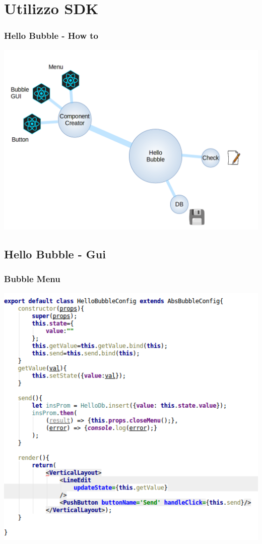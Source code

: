 \section{Utilizzo SDK}
\begin{frame}
	\frametitle{Hello Bubble - How to}
	\begin{center}
	\includegraphics[scale=0.30]{code/bubbleMap.png}
	\end{center}
\end{frame}

\subsection{Hello Bubble - Gui}
\begin{frame}
	\frametitle{Bubble Menu}
	\begin{center}
	\includegraphics[scale=0.40]{code/hellobubbleconfig.png}
	\end{center}
\end{frame}

